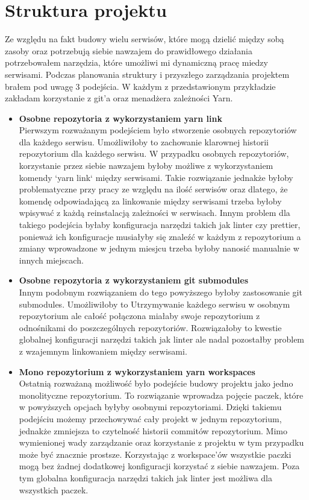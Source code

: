 \section{Struktura projektu}
Ze względu na fakt budowy wielu serwisów, które mogą dzielić między sobą zasoby oraz potrzebują siebie nawzajem do prawidłowego działania potrzebowałem narzędzia, które umożliwi mi dynamiczną pracę miedzy serwisami. Podczas planowania struktury i przyszłego zarządzania projektem brałem pod uwagę 3 podejścia. W każdym z przedstawionym przykładzie zakładam korzystanie z git'a oraz menadżera zależności Yarn.

\begin{itemize}
    \item \textbf {Osobne repozytoria z wykorzystaniem yarn link} \\
        Pierwszym rozważanym podejściem było stworzenie osobnych repozytoriów dla każdego serwisu.
        Umożliwiłoby to zachowanie klarownej historii repozytorium dla każdego serwisu. W przypadku osobnych repozytoriów, korzystanie przez siebie nawzajem byłoby możliwe z wykorzystaniem komendy `yarn link` między serwisami. Takie rozwiązanie jednakże byłoby problematyczne przy pracy ze względu na ilość serwisów oraz dlatego, że komendę odpowiadającą za linkowanie między serwisami trzeba byłoby wpisywać z każdą reinstalacją zależności w serwisach. Innym problem dla takiego podejścia byłaby konfiguracja narzędzi takich jak linter czy prettier, ponieważ ich konfiguracje musiałyby się znaleźć w każdym z repozytorium a zmiany wprowadzone w jednym miesjcu trzeba byłoby nanosić manualnie w innych miejscach.

    \item \textbf {Osobne repozytoria z wykorzystaniem git submodules} \\
        Innym podobnym rozwiązaniem do tego powyższego byłoby zastosowanie git submodules. Umożliwiłoby to Utrzymywanie każdego serwisu w osobnym repozytorium ale całość połączona miałaby swoje repozytorium z odnośnikami do poszczególnych repozytoriów. Rozwiązałoby to kwestie globalnej konfiguracji narzędzi takich jak linter ale nadal pozostałby problem z wzajemnym linkowaniem między serwisami.

    \item \textbf {Mono repozytorium z wykorzystaniem yarn workspaces} \\
        Ostatnią rozważaną możliwość było podejście budowy projektu jako jedno monolityczne repozytorium. To rozwiązanie wprowadza pojęcie paczek, które w powyższych opcjach byłyby osobnymi repozytoriami. Dzięki takiemu podejściu możemy przechowywać cały projekt w jednym repozytorium, jednakże zmniejsza to czytelność historii commitów repozytorium. Mimo wymienionej wady zarządzanie oraz korzystanie z projektu w tym przypadku może być znacznie prostsze. Korzystając z workspace'ów wszystkie paczki mogą bez żadnej dodatkowej konfiguracji korzystać z siebie nawzajem. Poza tym globalna konfiguracja narzędzi takich jak linter jest możliwa dla wszystkich paczek.

\end{itemize}

